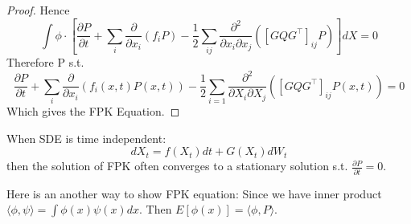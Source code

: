 \begin{proof}
    Hence $$\int \phi \cdot\left[\frac{\partial P}{\partial t}+\sum_{i} \frac{\partial}{\partial x_{i}}\left(f_{i} P\right)-\frac{1}{2} \sum_{i j} \frac{\partial^{2}}{\partial x_{i} \partial x_{j}}\left(\left[G Q G^{\top}\right]_{i j} P\right)\right] d X=0$$
    Therefore P s.t.    
    \begin{equation}
        \frac{\partial P}{\partial t}+\sum_{i} \frac{\partial}{\partial x_{i}}\left(f_{i}(x, t) P(x, t)\right)-\frac{1}{2} \sum_{i=1} \frac{\partial^{2}}{\partial X_{i} \partial X_{j}}\left(\left[G Q G^{\top}\right]_{i j} P\left(x,t\right)\right)=0
    \end{equation}
    Which gives the FPK Equation.
\end{proof}

\begin{remark}
    When SDE is time independent:  
    \begin{equation}
        d X_t=f(X_t) d t+G(X_t) d W_{t}  
    \end{equation}
    then the solution of FPK often converges to a stationary solution s.t.  $\frac{\partial P}{\partial t}=0$.
\end{remark}
Here is an another way to show FPK equation: Since we have inner product $\langle\phi, \psi\rangle=\int \phi(x)\psi(x)dx$. Then $E[\phi(x)]=\langle\phi, P\rangle$.

